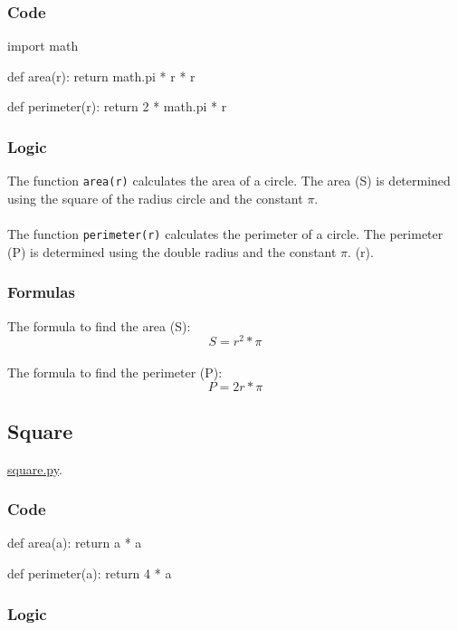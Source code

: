 \documentclass[12pt]{article}
\begin{document}
\subsubsection{Code}

\begin{python}
import math

def area(r):
    return math.pi * r * r

def perimeter(r):
    return 2 * math.pi * r
\end{python}

\subsubsection{Logic}

The function \texttt{area(r)} calculates the area of a circle. The area (S) is determined using the square of the radius circle and the constant \(\pi\). \\
\\
The function \texttt{perimeter(r)} calculates the perimeter of a circle. The perimeter (P) is determined using the double radius and the constant \(\pi\). (r).

\subsubsection{Formulas}

The formula to find the area (S): 
\[S = r^2 * \pi\] \\
The formula to find the perimeter (P):
\[P = 2r * \pi\]

\newpage

\subsection{Square}
\href{https://github.com/niumandzi/geometric_lib/blob/docs/square.py}{square.py}.

\subsubsection{Code}

\begin{python}
def area(a):
    return a * a

def perimeter(a):
    return 4 * a
\end{python}

\subsubsection{Logic}
\end{document}
